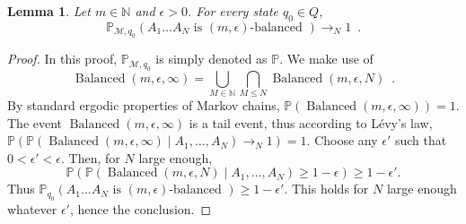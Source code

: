\documentclass[11pt]{article}
\newtheorem{lemma}{Lemma}
\newcommand{\M}{\mathcal{M}}
\newcommand{\NN}{\mathbb{N}}
\newcommand{\PP}{\mathbb{P}}
\DeclareMathOperator{\freq}{Freq}
\DeclareMathOperator{\good}{Balanced}
\begin{document}
\begin{lemma}\label{lem}
Let $m\in \NN$ and $\epsilon >0$.
For every state $q_0\in Q$,
\[
\PP_{\M,q_0}\left(A_1\ldots A_N \text{ is  $(m,\epsilon)$-balanced }\right)\to_N 1\enspace.
\]
\end{lemma}
\begin{proof}
In this proof, $\PP_{\M,q_0}$ is simply denoted as $\PP$.
We make use of
\[
\good(m,\epsilon, \infty)= \bigcup_{M\in\NN} \bigcap_{M \leq N}  \good(m,\epsilon, N)\enspace.
\]
By standard ergodic properties of Markov chains,
$\PP\left(\good(m,\epsilon, \infty)\right)=1$.
The event $\good(m,\epsilon,\infty)$ is a tail event,
thus according to Lévy's law,
$
 \PP\left(
 \PP\left(  \good(m,\epsilon, \infty) \mid A_1,\ldots , A_N\right)  \to_N 1
 \right) = 1.
$
Choose any $\epsilon' $ such that $0 < \epsilon' < \epsilon$.
Then, for $N$ large enough,
\[
 \PP\left(
 \PP\left(  \good(m,\epsilon, N) \mid A_1,\ldots , A_N\right)  \geq 1 - \epsilon
 \right) 
 \geq 
 1-\epsilon'
 .
\]
Thus
$
\PP_{q_0}\left(A_1\ldots A_N \text{ is  $(m,\epsilon)$-balanced }\right)\geq  1-\epsilon'.
$
This holds for $N$ large enough whatever $\epsilon'$, hence the conclusion.
\end{proof}
\end{document}
